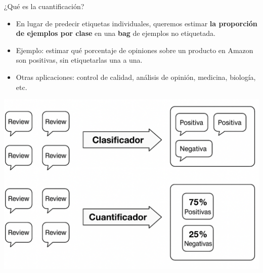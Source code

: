 \documentclass{beamer}
\begin{document}
\begin{frame}{¿Qué es la cuantificación?}
\begin{itemize}
    \item En lugar de predecir etiquetas individuales, queremos estimar \textbf{la proporción de ejemplos por clase} en una \textbf{bag} de ejemplos no etiquetada.
    \item Ejemplo: estimar qué porcentaje de opiniones sobre un producto en Amazon son positivas, sin etiquetarlas una a una.
    \item Otras aplicaciones: control de calidad, análisis de opinión, medicina, biología, etc.
\end{itemize}
\centering
\includegraphics[scale=0.13]{images/quantificaiton.png}
\end{frame}
\end{document}
